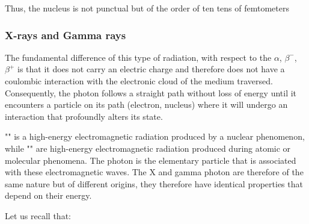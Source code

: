 	Thus, the nucleus is not punctual but of the order of ten tens of femtometers
	
	\subsubsection{X-rays and Gamma rays}
	The fundamental difference of this type of radiation, with respect to the $\alpha$, $\beta^-$, $\beta^+$ is that it does not carry an electric charge and therefore does not have a coulombic interaction with the electronic cloud of the medium traversed. Consequently, the photon follows a straight path without loss of energy until it encounters a particle on its path (electron, nucleus) where it will undergo an interaction that profoundly alters its state.

	"" is a high-energy electromagnetic radiation produced by a nuclear phenomenon, while "" are high-energy electromagnetic radiation produced during atomic or molecular phenomena. The photon is the elementary particle that is associated with these electromagnetic waves. The X and gamma photon are therefore of the same nature but of different origins, they therefore have identical properties that depend on their energy.

	Let us recall that:
	
